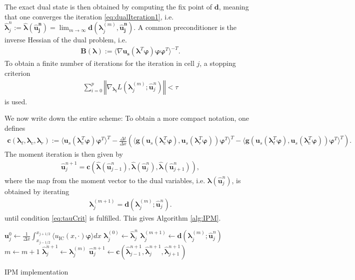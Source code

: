 The exact dual state is then obtained by computing the fix point of $\bm{d}$, meaning that one converges the iteration \eqref{eq:dualIteration1}, i.e. $\bm{\hat\lambda}_j^n:=\bm{\hat\lambda}(\bm{\hat u_j^n})=\lim_{m\rightarrow\infty}\bm{d}(\bm{\lambda}_j^{(m)},\bm{\hat{u}_j^n})$. A common preconditioner is the inverse Hessian of the dual problem, i.e.
\begin{align*}
\bm{B}(\bm{\lambda}) := \langle \nabla \bm{u}_{\bm{s}} (\bm{\lambda}^T\bm{\varphi})\bm{\varphi}\bm{\varphi}^T\rangle^{-T}.
\end{align*}
To obtain a finite number of iterations for the iteration in cell $j$, a stopping criterion 
\begin{align}\label{eq:tauCrit}
\sum_{i=0}^p\left\Vert \nabla_{\bm{\lambda_i}}L(\bm{\lambda}_j^{(m)};\bm{\hat{u}}_j^n) \right\Vert < \tau
\end{align}
is used.

We now write down the entire scheme: To obtain a more compact notation, one defines
\begin{align*}
\bm{c}\left(\bm{\lambda}_{\ell},\bm{\lambda}_c,\bm{\lambda}_r\right):= \langle \bm u_{s}(\bm{\lambda}_c^T\bm{\varphi})\bm{\varphi}^T\rangle^T - \frac{\Delta t}{\Delta x}\left(\langle \bm g(\bm u_{s}(\bm{\lambda}_c^T\bm{\varphi}),\bm u_{s}(\bm{\lambda}_r^T\bm{\varphi}))\bm{\varphi}^T\rangle^T-\langle \bm g(\bm u_{s}(\bm{\lambda}_{\ell}^T\bm{\varphi}),\bm u_{s}(\bm{\lambda}_c^T\bm{\varphi}))\bm{\varphi}^T\rangle^T\right).
\end{align*}
The moment iteration is then given by
\begin{align}\label{eq:momentIteration}
\bm{\hat u}_j^{n+1} = \bm{c}\left(\bm{\hat\lambda}(\bm{\hat u}_{j-1}^n),\bm{\hat\lambda}(\bm{\hat u}_{j}^n),\bm{\hat\lambda}(\bm{\hat u}_{j+1}^n)\right),
\end{align}
where the map from the moment vector to the dual variables, i.e. $\bm{\lambda}(\bm{\hat u}_{j}^n)$, is obtained by iterating
\begin{align}\label{eq:dualIteration}
\bm{\lambda}_j^{(m+1)} = \bm{d}(\bm{\lambda}_{j}^{(m)};\bm{\hat u}_j^{n}).
\end{align}
until condition \eqref{eq:tauCrit} is fulfilled. This gives Algorithm \ref{alg:IPM}.

\begin{algorithm}[H]
\begin{algorithmic}[1]
\State $\bm{u}_j^0 \leftarrow \frac{1}{\Delta x} \int_{x_{j-1/ 2}}^{x_{j+1/ 2}} \langle u_{\text{IC}}(x, \cdot) \bm{\varphi} \rangle dx$
\EndFor
{}
\State $\bm{\lambda}_j^{(0)} \leftarrow \bm{\hat \lambda}_j^{n}$
\State $\bm{\lambda}_j^{(m+1)} \leftarrow \bm{d}(\bm{\lambda}_{j}^{(m)};\bm{\hat u}_j^{n})$
\State $m \leftarrow m+1$
\EndWhile
\State $\bm{\hat \lambda}_j^{n+1} \leftarrow \bm{\lambda}_j^{(m)}$
\EndFor
{}
\State $\bm{\hat u}_j^{n+1} \leftarrow \bm{c}(\bm{\hat \lambda}_{j-1}^{n+1},\bm{\hat \lambda}_j^{n+1},\bm{\hat \lambda}_{j+1}^{n+1})$
\EndFor
\EndFor
\end{algorithmic}
\caption{IPM implementation}
\label{alg:IPM}
\end{algorithm}

